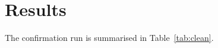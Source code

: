 \documentclass{article}
\begin{document}
\section{Results}
The confirmation run is summarised in Table~\ref{tab:clean}.
\begin{table}[htbp]
    \centering
    
    \caption{Fixture table (machine generated).}
    \label{tab:clean}
\end{table}
\end{document}
